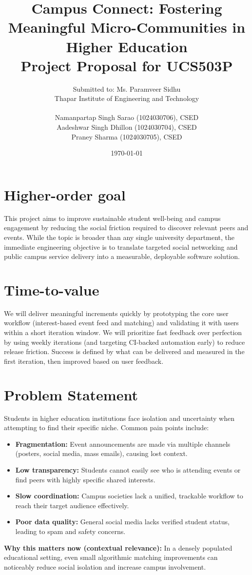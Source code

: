 \documentclass[12pt, a4paper]{article}
\title{\textbf{Campus Connect: Fostering Meaningful Micro-Communities in Higher Education} \\ \large Project Proposal for UCS503P}
\author{Submitted to: Ms. Paramveer Sidhu \\ 
Thapar Institute of Engineering and Technology \\ \\ 
Namanpartap Singh Sarao (1024030706), CSED \\ 
Aadeshwar Singh Dhillon (1024030704), CSED \\ 
Praney Sharma (1024030705), CSED}
\date{\today}
\begin{document}
\maketitle

\section{Higher-order goal} 
This project aims to improve sustainable student well-being and campus engagement by reducing the social friction required to discover relevant peers and events. While the topic is broader than any single university department, the immediate engineering objective is to translate targeted social networking and public campus service delivery into a measurable, deployable software solution.

\section{Time-to-value} 
We will deliver meaningful increments quickly by prototyping the core user workflow (interest-based event feed and matching) and validating it with users within a short iteration window. We will prioritize fast feedback over perfection by using weekly iterations (and targeting CI-backed automation early) to reduce release friction. Success is defined by what can be delivered and measured in the first iteration, then improved based on user feedback.

\section{Problem Statement} 
Students in higher education institutions face isolation and uncertainty when attempting to find their specific niche. Common pain points include:
\begin{itemize}
    \item \textbf{Fragmentation:} Event announcements are made via multiple channels (posters, social media, mass emails), causing lost context.
    \item \textbf{Low transparency:} Students cannot easily see who is attending events or find peers with highly specific shared interests.
    \item \textbf{Slow coordination:} Campus societies lack a unified, trackable workflow to reach their target audience effectively.
    \item \textbf{Poor data quality:} General social media lacks verified student status, leading to spam and safety concerns.
\end{itemize}
\textbf{Why this matters now (contextual relevance):} In a densely populated educational setting, even small algorithmic matching improvements can noticeably reduce social isolation and increase campus involvement.
\end{document}
